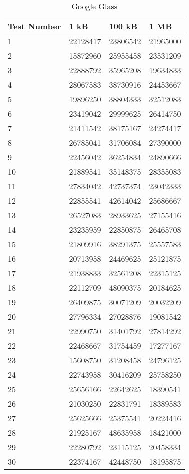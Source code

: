 	\begin{table}[ht!]
    		\caption{Google Glass} \label{tab:distamceSmartphoneFull}
		\centering \begin{tabularx}{\textwidth}{l|X|X|X} \hline
		Test Number & \textbf{1 kB} & \textbf{100 kB} & \textbf{1 MB} \\ \hline \hline

		1&	22128417	&	23806542	&	21965000	\\ \hline
		2&	15872960	&	25955458	&	23531209	\\ \hline
		3&	22888792	&	35965208	&	19634833	\\ \hline
		4&	28067583	&	38730916	&	24453667	\\ \hline
		5&	19896250	&	38804333	&	32512083	\\ \hline
		6&	23419042	&	29999625	&	26414750	\\ \hline
		7&	21411542	&	38175167	&	24274417	\\ \hline
		8&	26785041	&	31706084	&	27390000	\\ \hline
		9&	22456042	&	36254834	&	24890666	\\ \hline
		10&	21889541	&	35148375	&	28355083	\\ \hline
		11&	27834042	&	42737374	&	23042333	\\ \hline
		12&	22855541	&	42614042	&	25686667	\\ \hline
		13&	26527083	&	28933625	&	27155416	\\ \hline
		14&	23235959	&	22850875	&	26465708	\\ \hline
		15&	21809916	&	38291375	&	25557583	\\ \hline
		16&	20713958	&	24469625	&	25121875	\\ \hline
		17&	21938833	&	32561208	&	22315125	\\ \hline
		18&	22112709	&	48090375	&	20184625	\\ \hline
		19&	26409875	&	30071209	&	20032209	\\ \hline
		20&	27796334	&	27028876	&	19081542	\\ \hline
		21&	22990750	&	31401792	&	27814292	\\ \hline
		22&	22468667	&	31754459	&	17277167	\\ \hline
		23&	15608750	&	31208458	&	24796125	\\ \hline
		24&	22743958	&	30416209	&	25758250	\\ \hline
		25&	25656166	&	22642625	&	18390541	\\ \hline
		26&	21030250	&	22831791	&	18389583	\\ \hline
		27&	25625666	&	25375541	&	20224416	\\ \hline
		28&	21925167	&	48635958	&	18421000	\\ \hline
		29&	22280792	&	23115125	&	20458334	\\ \hline
		30&	22374167	&	42448750	&	18195875	\\ \hline
		
		\end{tabularx}
	\end{table}

